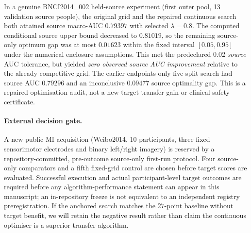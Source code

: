 In a genuine BNCI2014\_002 held-source experiment (first
outer pool, 13 validation source people), the original grid
and the repaired continuous search both attained source
macro-AUC $0.79397$ with selected $\lambda=0.8$.
The computed conditional source upper bound decreased to
$0.81019$, so the remaining source-only optimum gap
was at most $0.01623$ within the fixed interval
$[0.05,0.95]$ under the numerical enclosure assumptions.
This met the predeclared 0.02 \emph{source} AUC tolerance,
but yielded \emph{zero observed source AUC improvement}
relative to the already competitive grid. The earlier
endpoints-only five-split search had source AUC $0.79296$
and an inconclusive $0.09477$ source optimality gap.
This is a repaired optimisation audit, not a new target
transfer gain or clinical safety certificate.

\paragraph{External decision gate.}
A new public MI acquisition (Weibo2014, 10 participants,
three fixed sensorimotor electrodes and binary left/right
imagery) is reserved by a repository-committed, pre-outcome
source-only first-run protocol. Four source-only comparators
and a fifth fixed-grid control are chosen before target
scores are evaluated. Successful execution and actual
participant-level target outcomes are required before any
algorithm-performance statement can appear in this
manuscript; an in-repository freeze is not equivalent
to an independent registry preregistration. If the anchored
search matches the 27-point baseline without target benefit,
we will retain the negative result rather than claim the
continuous optimiser is a superior transfer algorithm.
